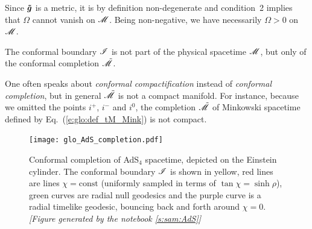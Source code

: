\begin{remark}
Since $\bm{\tilde{g}}$ is a metric, it is by definition non-degenerate and
condition~2 implies that $\Omega$ cannot vanish on $\mathscr{M}$. Being non-negative,
we have necessarily $\Omega > 0$ on $\mathscr{M}$.
\end{remark}

\begin{remark}
The conformal boundary $\mathscr{I}$ is not part of the physical spacetime
$\mathscr{M}$, but only of the conformal completion $\tilde{\mathscr{M}}$.
\end{remark}

\begin{remark}
One often speaks about
\emph{conformal compactification}
instead of \emph{conformal completion}, but in general $\tilde{\mathscr{M}}$ is not a
compact manifold. For instance, because we omitted the points $i^+$, $i^-$ and $i^0$,
the completion $\tilde{\mathscr{M}}$ of Minkowski spacetime defined by Eq.~(\ref{e:glo:def_tM_Mink})
is not compact.
\end{remark}

\begin{figure}
\centerline{\texttt{[image: glo\_AdS\_completion.pdf]}}
\caption[]{\label{f:glo:AdS_completion} \footnotesize
Conformal completion of AdS$_{4}$ spacetime, depicted on the Einstein cylinder.
The conformal boundary $\mathscr{I}$ is shown in yellow, red lines are lines
$\chi=\mathrm{const}$ (uniformly sampled in terms of $\tan\chi = \sinh\rho$),
green curves are radial null geodesics and the purple curve
is a radial timelike geodesic, bouncing back and forth around $\chi=0$.
\textsl{[Figure generated by the notebook \ref{s:sam:AdS}]}
}
\end{figure}


